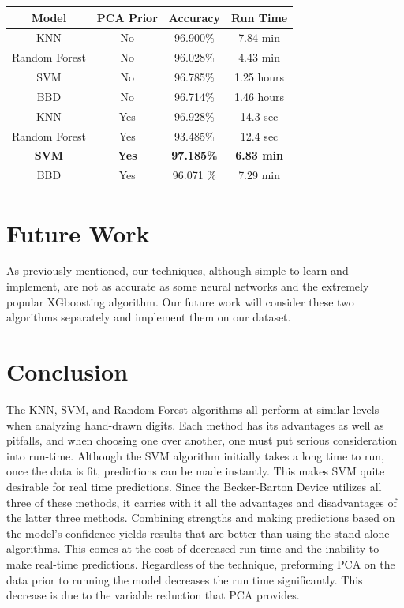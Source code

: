 \documentclass[11pt, oneside]{article}   	%
\begin{document}
\begin{center}
\begin{tabular}{ |c|c|c|c| } 
\hline
Model & PCA Prior & Accuracy & Run Time\\
 \hline \hline
  KNN & No & 96.900\% &  7.84 min\\ 
Random Forest & No &  96.028\% & 4.43 min\\ 
 SVM & No & 96.785\%  & 1.25 hours\\ 
 BBD & No & 96.714\% & 1.46 hours\\
 \hline
 KNN & Yes & 96.928\% & 14.3 sec\\ 
Random Forest & Yes & 93.485\% & 12.4 sec \\ 
 \textbf{SVM} & \textbf{Yes} & \textbf{97.185\%} & \textbf{6.83 min}\\ 
 BBD & Yes & 96.071 \%  & 7.29 min\\
 \hline
\end{tabular}
\end{center}

\section{Future Work}
As previously mentioned, our techniques, although simple to learn and implement, are not as accurate as some neural networks and the extremely popular XGboosting algorithm. Our future work will consider these two algorithms separately and implement them on our dataset. 

\section{Conclusion}
The KNN, SVM, and Random Forest algorithms all perform at similar levels when analyzing hand-drawn digits. Each method has its advantages as well as pitfalls, and when choosing one over another, one must put serious consideration into run-time. Although the SVM algorithm initially takes a long time to run, once the data is fit, predictions can be made instantly. This makes SVM quite desirable for real time predictions. Since the Becker-Barton Device utilizes all three of these methods, it carries with it all the advantages and disadvantages of the latter three methods. Combining strengths and making predictions based on the model's confidence yields results that are better than using the stand-alone algorithms. This comes at the cost of decreased run time and the inability to make real-time predictions. Regardless of the technique, preforming PCA on the data prior to running the model decreases the run time significantly. This decrease is due to the variable reduction that PCA provides. 
\end{document}

